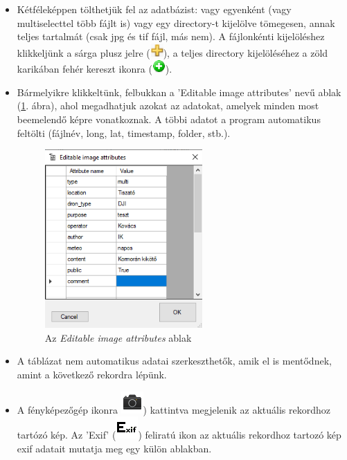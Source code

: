 \documentclass[a4paper,12pt]{article}
\begin{document}
\begin{itemize}
	\item Kétféleképpen tölthetjük fel az adatbázist: vagy egyenként (vagy multiselecttel több fájlt is) vagy egy directory-t kijelölve tömegesen, annak teljes tartalmát (csak jpg és tif fájl, más nem). A fájlonkénti kijelöléshez klikkeljünk a sárga plusz jelre (\includegraphics[width=0.5cm]{plus.png}), a teljes directory kijelöléséhez a zöld karikában fehér kereszt ikonra (\includegraphics[width=0.5cm]{addfolder.png}).
	
	\item Bármelyikre klikkeltünk, felbukkan a 'Editable image attributes' nevű ablak (\ref{fig:editableimageattribute}. ábra), ahol megadhatjuk azokat az adatokat, amelyek minden most beemelendő képre vonatkoznak. A többi adatot a program automatikus feltölti (fájlnév, long, lat, timestamp, folder, stb.).
	
	\begin{figure}
		\centering
		\includegraphics[width=6cm]{editableimageattributes.png}
		\caption{Az \textit{Editable image attributes} ablak}
		\label{fig:editableimageattribute}
	\end{figure}
	
	\item A táblázat nem automatikus adatai szerkeszthetők, amik el is mentődnek, amint a következő rekordra lépünk.
	
	\item A fényképezőgép ikonra \includegraphics[width = 0.5 cm]{camera.png}) kattintva megjelenik az aktuális rekordhoz tartózó kép. Az 'Exif' (\includegraphics[width = 0.6 cm]{exif.png}) feliratú ikon az aktuális rekordhoz tartozó kép exif adatait mutatja meg egy külön ablakban.
\end{itemize}
\end{document}
